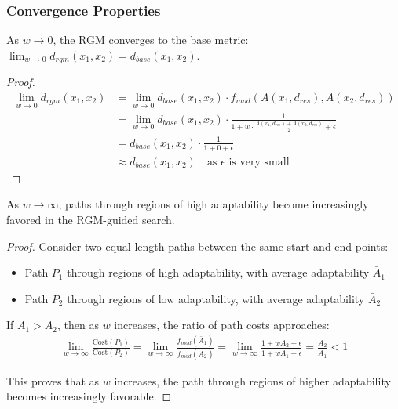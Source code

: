 \documentclass{article}
\begin{document}
\subsubsection{Convergence Properties}
\begin{theorem}
As $w \to 0$, the RGM converges to the base metric: $\lim_{w \to 0} d_{rgm}(x_1, x_2) = d_{base}(x_1, x_2)$.
\end{theorem}

\begin{proof}
\begin{align}
\lim_{w \to 0} d_{rgm}(x_1, x_2) &= \lim_{w \to 0} d_{base}(x_1, x_2) \cdot f_{mod}(A(x_1, d_{res}), A(x_2, d_{res}))\\
&= \lim_{w \to 0} d_{base}(x_1, x_2) \cdot \frac{1}{1 + w \cdot \frac{A(x_1, d_{res}) + A(x_2, d_{res})}{2} + \epsilon}\\
&= d_{base}(x_1, x_2) \cdot \frac{1}{1 + 0 + \epsilon}\\
&\approx d_{base}(x_1, x_2) \quad \text{as } \epsilon \text{ is very small}
\end{align}
\end{proof}

\begin{theorem}
As $w \to \infty$, paths through regions of high adaptability become increasingly favored in the RGM-guided search.
\end{theorem}

\begin{proof}
Consider two equal-length paths between the same start and end points:
\begin{itemize}
    \item Path $P_1$ through regions of high adaptability, with average adaptability $\bar{A}_1$
    \item Path $P_2$ through regions of low adaptability, with average adaptability $\bar{A}_2$
\end{itemize}

If $\bar{A}_1 > \bar{A}_2$, then as $w$ increases, the ratio of path costs approaches:
\begin{align}
\lim_{w \to \infty} \frac{\text{Cost}(P_1)}{\text{Cost}(P_2)} = \lim_{w \to \infty} \frac{f_{mod}(\bar{A}_1)}{f_{mod}(\bar{A}_2)} = \lim_{w \to \infty} \frac{1 + w\bar{A}_2 + \epsilon}{1 + w\bar{A}_1 + \epsilon} = \frac{\bar{A}_2}{\bar{A}_1} < 1
\end{align}

This proves that as $w$ increases, the path through regions of higher adaptability becomes increasingly favorable.
\end{proof}
\end{document}
